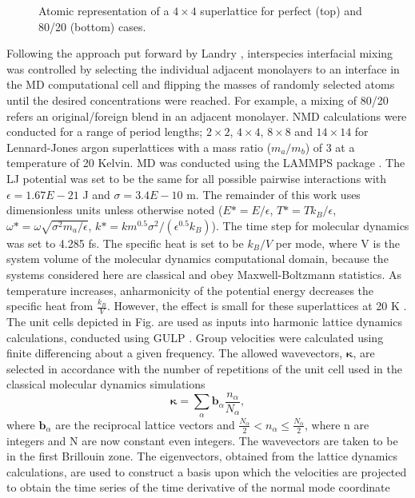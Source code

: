 \documentclass[aps,prb,preprint,preprintnumbers,amsmath,amssymb,floatfix,superscriptaddress]{revtex4}
\begin{document}
\begin{figure*}[ht!]
\begin{center}
\renewcommand{\figure}{Fig.}
\caption{Atomic representation of a $4\times4$ superlattice for perfect (top) and 80/20 (bottom) cases.}
\label{fig:dispersion}
\end{center}
\end{figure*}

Following the approach put forward by Landry \cite{PhysRevB.79.075316}, interspecies interfacial mixing was controlled by selecting the individual adjacent monolayers to an interface in the MD computational cell and flipping the masses of randomly selected atoms until the desired concentrations were reached. For example, a mixing of 80/20 refers an original/foreign blend in an adjacent monolayer. NMD calculations were conducted for a range of period lengths; $2\times2$, $4\times4$, $8\times8$ and $14\times14$ for Lennard-Jones argon superlattices with a mass ratio ($m_a/m_b$) of 3 at a temperature of 20 Kelvin. MD was conducted using the LAMMPS package \cite{LAMMPS}. The LJ potential was set to be the same for all possible pairwise interactions with $\epsilon= 1.67E-21$ J and $\sigma= 3.4E-10$ m. The remainder of this work uses dimensionless units unless otherwise noted ($E*=E/\epsilon$, $T*=Tk_B/\epsilon$, $\omega*=\omega\sqrt{\sigma^2m_a/\epsilon}$, $k*=km^{0.5}\sigma^2/(\epsilon^{0.5}k_B)$). The time step for molecular dynamics was set to 4.285 fs. The specific heat is set to be $k_B/V$ per mode, where V is the system volume of the molecular dynamics computational domain, because the systems considered here are classical and obey Maxwell-Boltzmann statistics. As temperature increases, anharmonicity of the potential energy decreases the specific heat from $\frac{k_B}{V}$. However, the effect is small for these superlattices at 20 K \cite{Jason}. The unit cells depicted in Fig. are used as inputs into harmonic lattice dynamics calculations, conducted using GULP \cite{GULP}. Group velocities were calculated using finite differencing about a given frequency. The allowed wavevectors, $\pmb{\kappa}$, are selected in accordance with the number of repetitions of the unit cell used in the classical molecular dynamics simulations
\begin{equation}\label{EQ:NMD:allowdkpt}
\pmb{\kappa} = \sum_{\alpha} \pmb{b}_{\alpha} \frac{n_{\alpha}}{N_{\alpha}},
\end{equation}
where $\pmb{b}_\alpha$ are the reciprocal lattice vectors and $ \frac{N_\alpha}{2} < n_\alpha \le \frac {N_\alpha}{2}$, where n are integers and N are now constant even integers. The wavevectors are taken to be in the first Brillouin zone. The eigenvectors, obtained from the lattice dynamics calculations, are used to construct a basis upon which the velocities are projected to obtain the time series of the time derivative of the normal mode coordinate 
\end{document}
